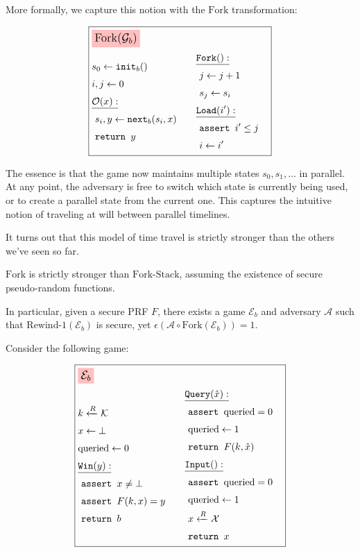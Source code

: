 More formally, we capture this notion with the
$\text{Fork}$ transformation:

\begin{game}
\captionsetup{justification=centering}
$$
\boxed{
\begin{aligned}
&\colorbox{pink}{\large $\text{Fork}(\mathcal{G}_b)$}\cr
&\begin{aligned}
    &s_0 \gets \texttt{init}_b()\cr
    &i, j \gets 0\cr
    &\underline{\mathcal{O}(x):}\cr
    &\ s_i, y \gets \texttt{next}_b(s_i, x)\cr
    &\ \texttt{return } y\cr
\end{aligned}
&\begin{aligned}
    &\underline{\texttt{Fork}():}\cr
    &\ j \gets j + 1\cr
    &\ s_j \gets s_i\cr
    &\underline{\texttt{Load}(i'):}\cr
    &\ \texttt{assert } i' \leq j\cr
    &\ i \gets i'\cr
\end{aligned}\cr
\end{aligned}
}
$$
\caption{$\text{Fork}(\mathcal{G}_b)$}
\end{game}

The essence is that the game now maintains multiple states $s_0, s_1, \ldots$
in parallel.
At any point, the adversary is free to switch which state is currently
being used, or to create a parallel state from the current one.
This captures the intuitive notion of traveling at will between
parallel timelines.

It turns out that this model of time travel is strictly stronger than the
others we've seen so far.

\begin{claim}
    \label{claim:fork-is-strong}
    $\text{Fork}$ is strictly stronger than $\text{Fork-Stack}$,
    assuming the existence of secure pseudo-random functions.

    In particular, given a secure PRF $F$, there exists a game $\mathcal{E}_b$ and adversary $\mathcal{A}$ such that 
    $\text{Rewind-1}(\mathcal{E}_b)$ is secure, yet $\epsilon(\mathcal{A} \circ \text{Fork}(\mathcal{E}_b)) = 1$.
\end{claim}

Consider the following game:

$$
\boxed{
\begin{aligned}
&\colorbox{pink}{\large $\mathcal{E}_b$}\cr
&\begin{aligned}
    &k \xleftarrow{R} \mathcal{K}\cr
    &x \gets \bot\cr
    &\text{queried} \gets 0\cr
    &\underline{\texttt{Win}(y):}\cr
    &\ \texttt{assert } x \neq \bot\cr
    &\ \texttt{assert } F(k, x) = y\cr
    &\ \texttt{return } b\cr
\end{aligned}
&\begin{aligned}
    &\underline{\texttt{Query}(\hat{x}):}\cr
    &\ \texttt{assert } \text{queried} = 0\cr
    &\ \text{queried} \gets 1\cr
    &\ \texttt{return } F(k, \hat{x})\cr
    &\underline{\texttt{Input}():}\cr
    &\ \texttt{assert } \text{queried} = 0\cr
    &\ \text{queried} \gets 1\cr
    &\ x \xleftarrow{R} \mathcal{X}\cr
    &\ \texttt{return } x\cr
\end{aligned}\cr
\end{aligned}
}
$$

